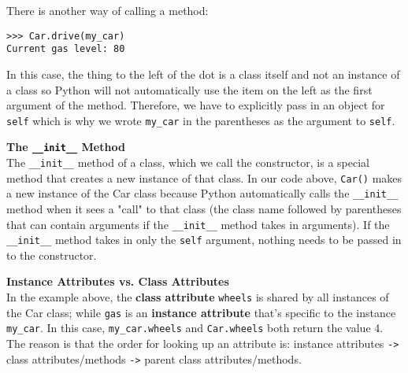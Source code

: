 There is another way of calling a method:
\begin{lstlisting}
>>> Car.drive(my_car)
Current gas level: 80
\end{lstlisting}
In this case, the thing to the left of the dot is a class itself and not an instance of a class so Python will not automatically use the item on the left as the first argument of the method. Therefore, we have to explicitly pass in an object for \lstinline{self} which is why we wrote \lstinline{my_car} in the parentheses as the argument to \lstinline{self}.

\textbf{The \lstinline{__init__} Method} \\
The \lstinline{__init__} method of a class, which we call the constructor, is a special method that creates a new instance of that class. In our code above, \lstinline{Car()} makes a new instance of the Car class because Python automatically calls the \lstinline{__init__} method when it sees a "call" to that class (the class name followed by parentheses that can contain arguments if the \lstinline{__init__} method takes in arguments). If the \lstinline{__init__} method takes in only the \lstinline{self} argument, nothing needs to be passed in to the constructor.

\textbf{Instance Attributes vs. Class Attributes} \\
In the example above, the \textbf{class attribute} \lstinline{wheels} is shared by all instances of the Car class; while \lstinline{gas} is an \textbf{instance attribute} that’s specific to the instance \lstinline{my_car}.
In this case, \lstinline{my_car.wheels} and \lstinline{Car.wheels} both return the value 4. The reason is that the order for looking up an attribute is: instance attributes \lstinline{->} class attributes/methods \lstinline{->} parent class attributes/methods.
